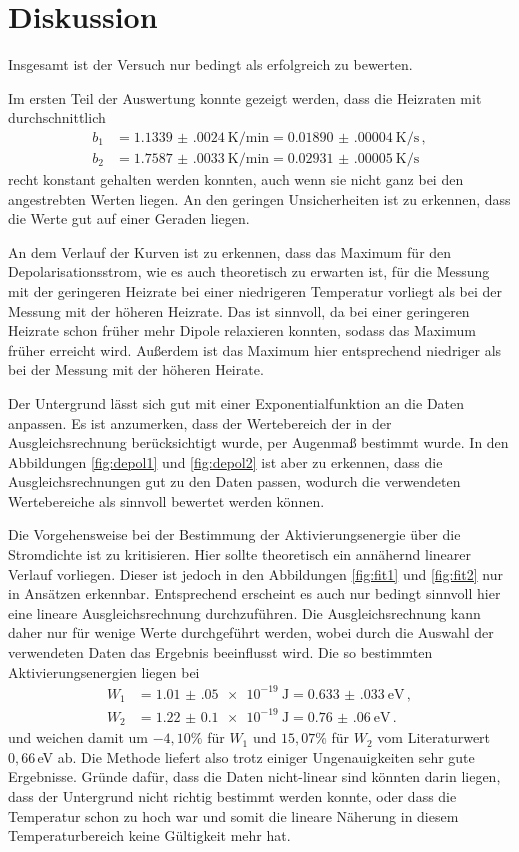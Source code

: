 \newpage
\section{Diskussion}
\label{sec:Diskussion}

Insgesamt ist der Versuch nur bedingt als erfolgreich zu bewerten.

Im ersten Teil der Auswertung konnte gezeigt werden, dass die Heizraten mit
durchschnittlich
\begin{align*}
  b_1&=\SI{1.1339(0024)}{\kelvin\per\minute}= \SI{0.01890(00004)}{\kelvin\per\second}\,, \\
  b_2&=\SI{1.7587(0033)}{\kelvin\per\minute}= \SI{0.02931(00005)}{\kelvin\per\second}\,
\end{align*}
recht konstant gehalten werden konnten, auch wenn sie nicht ganz bei den angestrebten
Werten liegen. An den geringen Unsicherheiten ist zu erkennen, dass die Werte gut auf einer
Geraden liegen.

An dem Verlauf der Kurven ist zu erkennen, dass das Maximum für den Depolarisationsstrom,
wie es auch theoretisch zu erwarten ist, für die Messung mit der geringeren Heizrate bei
einer niedrigeren Temperatur vorliegt als bei der Messung mit der höheren Heizrate. Das ist
sinnvoll, da bei einer geringeren Heizrate schon früher mehr Dipole relaxieren konnten, sodass
das Maximum früher erreicht wird. Außerdem ist das Maximum hier entsprechend niedriger als
bei der Messung mit der höheren Heirate.

Der Untergrund lässt sich gut mit einer Exponentialfunktion an die Daten anpassen.
Es ist anzumerken, dass der Wertebereich der in der Ausgleichsrechnung berücksichtigt wurde,
per Augenmaß bestimmt wurde. In den
Abbildungen \ref{fig:depol1} und \ref{fig:depol2} ist aber zu erkennen, dass die Ausgleichsrechnungen
gut zu den Daten passen, wodurch die verwendeten Wertebereiche als sinnvoll bewertet werden können.

Die Vorgehensweise bei der Bestimmung der Aktivierungsenergie über die Stromdichte ist zu kritisieren.
Hier sollte theoretisch ein annähernd linearer Verlauf vorliegen. Dieser ist jedoch
in den Abbildungen \ref{fig:fit1} und \ref{fig:fit2} nur in Ansätzen erkennbar.
Entsprechend erscheint es auch nur bedingt sinnvoll hier eine lineare Ausgleichsrechnung
durchzuführen. Die Ausgleichsrechnung kann daher nur für wenige Werte durchgeführt
werden, wobei durch die Auswahl der verwendeten Daten das Ergebnis beeinflusst
wird. Die so bestimmten Aktivierungsenergien liegen bei
\begin{align*}
 W_1&=\SI{1.01(05)e-19}{\joule}= \SI{0.633(033)}{\eV}  \,, \\
 W_2&=\SI{1.22(010)e-19}{\joule}=\SI{0.76(06)}{\eV} \,.
\end{align*}
und weichen damit um $-4{,}10\%$ für $W_1$ und $15{,}07\%$ für
$W_2$ vom Literaturwert $0{,}66\,$eV ab. Die Methode liefert also trotz einiger
Ungenauigkeiten sehr gute Ergebnisse.
Gründe dafür, dass die Daten nicht-linear sind könnten darin liegen, dass der Untergrund
nicht richtig bestimmt werden konnte, oder dass die Temperatur schon zu hoch war und somit
die lineare Näherung in diesem Temperaturbereich keine Gültigkeit mehr hat.

